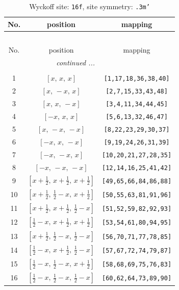 \documentclass[fleqn,8pt]{jsarticle}
\begin{document}
\begin{longtable}{ccc}
\caption{Wyckoff site: {\tt 16f}, site symmetry: {\tt .3m'}}
 \\
 \hline \hline
No. & position & mapping \\ \hline \endfirsthead

\multicolumn{2}{l}{\tablename\ \thetable{}} \\
 \hline \hline
No. & position & mapping \\ \hline \endhead

 \hline \hline
\multicolumn{2}{r}{\footnotesize\it continued ...} \\ \endfoot

 \hline \hline
\multicolumn{2}{r}{} \\ \endlastfoot

1 & $\left[ x,\, x,\, x \right]$ & {\tt [1,17,18,36,38,40]} \\ \hline
2 & $\left[ x,\, - x,\, x \right]$ & {\tt [2,7,15,33,43,48]} \\ \hline
3 & $\left[ x,\, x,\, - x \right]$ & {\tt [3,4,11,34,44,45]} \\ \hline
4 & $\left[ - x,\, x,\, x \right]$ & {\tt [5,6,13,32,46,47]} \\ \hline
5 & $\left[ x,\, - x,\, - x \right]$ & {\tt [8,22,23,29,30,37]} \\ \hline
6 & $\left[ - x,\, x,\, - x \right]$ & {\tt [9,19,24,26,31,39]} \\ \hline
7 & $\left[ - x,\, - x,\, x \right]$ & {\tt [10,20,21,27,28,35]} \\ \hline
8 & $\left[ - x,\, - x,\, - x \right]$ & {\tt [12,14,16,25,41,42]} \\ \hline
9 & $\left[ x + \frac{1}{2},\, x + \frac{1}{2},\, x + \frac{1}{2} \right]$ & {\tt [49,65,66,84,86,88]} \\ \hline
10 & $\left[ x + \frac{1}{2},\, \frac{1}{2} - x,\, x + \frac{1}{2} \right]$ & {\tt [50,55,63,81,91,96]} \\ \hline
11 & $\left[ x + \frac{1}{2},\, x + \frac{1}{2},\, \frac{1}{2} - x \right]$ & {\tt [51,52,59,82,92,93]} \\ \hline
12 & $\left[ \frac{1}{2} - x,\, x + \frac{1}{2},\, x + \frac{1}{2} \right]$ & {\tt [53,54,61,80,94,95]} \\ \hline
13 & $\left[ x + \frac{1}{2},\, \frac{1}{2} - x,\, \frac{1}{2} - x \right]$ & {\tt [56,70,71,77,78,85]} \\ \hline
14 & $\left[ \frac{1}{2} - x,\, x + \frac{1}{2},\, \frac{1}{2} - x \right]$ & {\tt [57,67,72,74,79,87]} \\ \hline
15 & $\left[ \frac{1}{2} - x,\, \frac{1}{2} - x,\, x + \frac{1}{2} \right]$ & {\tt [58,68,69,75,76,83]} \\ \hline
16 & $\left[ \frac{1}{2} - x,\, \frac{1}{2} - x,\, \frac{1}{2} - x \right]$ & {\tt [60,62,64,73,89,90]} \\
\end{longtable}
\end{document}
